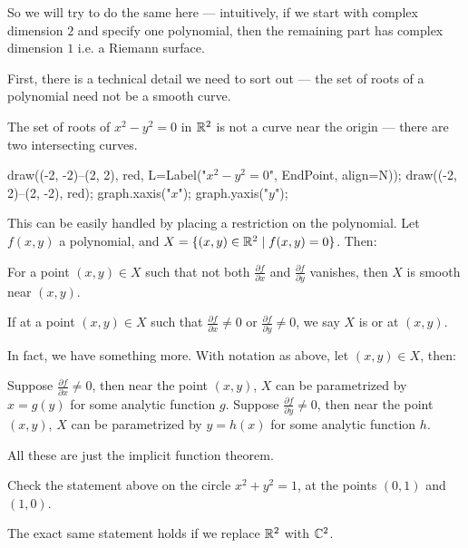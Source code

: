 So we will try to do the same here --- intuitively, if we start with complex dimension $2$ and
specify one polynomial, then the remaining part has complex dimension $1$ i.e. a Riemann surface.

First, there is a technical detail we need to sort out ---
the set of roots of a polynomial need not be a smooth curve.
\begin{example}
	The set of roots of $x^2-y^2 = 0$ in $\mathbb R^2$ is not a curve near the origin --- there are two
	intersecting curves.
	\begin{center}
		\begin{asy}
			draw((-2, -2)--(2, 2), red, L=Label("$x^2-y^2=0$", EndPoint, align=N));
			draw((-2, 2)--(2, -2), red);
			graph.xaxis("$x$");
			graph.yaxis("$y$");
		\end{asy}
	\end{center}
\end{example}

This can be easily handled by placing a restriction on the polynomial.
Let $f(x, y)$ a polynomial, and $X = \{(x, y) \in \mathbb R^2 \mid f(x, y) = 0 \}$. Then:
\begin{theorem}
	For a point $(x, y) \in X$ such that not both
	$\frac{\partial f}{\partial x}$ and $\frac{\partial f}{\partial y}$ vanishes, then $X$
	is smooth near $(x, y)$.
\end{theorem}

If at a point $(x, y) \in X$ such that
$\frac{\partial f}{\partial x} \neq 0$ or $\frac{\partial f}{\partial y} \neq 0$,
we say $X$ is  or  at $(x, y)$.

In fact, we have something more. With notation as above, let $(x, y) \in X$, then:
\begin{itemize}
	\ii Suppose $\frac{\partial f}{\partial x} \neq 0$, then near the point $(x, y)$, $X$ can be
	parametrized by $x = g(y)$ for some analytic function $g$.
	\ii Suppose $\frac{\partial f}{\partial y} \neq 0$, then near the point $(x, y)$, $X$ can be
	parametrized by $y = h(x)$ for some analytic function $h$.
\end{itemize}
All these are just the implicit function theorem.

\begin{exercise}
	Check the statement above on the circle $x^2 + y^2 = 1$, at the points $(0, 1)$ and $(1, 0)$.
\end{exercise}

The exact same statement holds if we replace $\mathbb R^2$ with $\mathbb C^2$.

